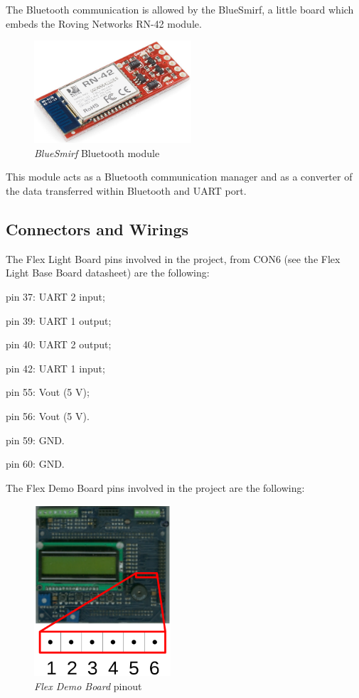 \documentclass[twoside]{article}
\begin{document}
\begin{multicols}{2}
The Bluetooth communication is allowed by the BlueSmirf, a little board which embeds the Roving Networks RN-42 module.

\begin{figure}[H]
  \centering
  \includegraphics[width=2.3in]{img/bluesmirf_presentation}
  \caption{\textit{BlueSmirf} Bluetooth module}
\end{figure}

This module acts as a Bluetooth communication manager and as a converter of the data transferred within Bluetooth and UART port.

\subsection{Connectors and Wirings}

The Flex Light Board pins involved in the project, from CON6 (see the Flex Light Base Board datasheet) are the following:

\begin{compactitem}
\item pin 37: UART 2 input;
\item pin 39: UART 1 output;
\item pin 40: UART 2 output;
\item pin 42: UART 1 input;
\item pin 55: Vout (5 V);
\item pin 56: Vout (5 V).
\item pin 59: GND.
\item pin 60: GND.
\end{compactitem}

The Flex Demo Board pins involved in the project are the following:

\begin{figure}[H]
  \centering
  \includegraphics[width=2in]{img/flex_demo_board_pinout}
  \caption{\textit{Flex Demo Board} pinout}
\end{figure}


\end{multicols}
\end{document}
